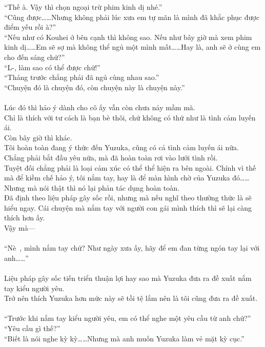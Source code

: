 \documentclass[12pt,a4paper, twosides]{book}
\begin{document}
“Thế à. Vậy thì chọn ngoại trừ phim kinh dị nhé.”\\
“Cũng được……Nhưng không phải lúc xưa em tự mãn là mình đã khắc phục được điểm yếu rồi à?”\\
“Nếu như có Kouhei ở bên cạnh thì không sao. Nếu như bây giờ mà xem phim kinh dị……Em sẽ sợ mà không thể ngủ một mình mất……Hay là, anh sẽ ở cùng em cho đến sáng chứ?”\\
“L-, làm sao có thể được chứ!”\\
“Tháng trước chẳng phải đã ngủ cùng nhau sao.”\\
“Chuyện đó là chuyện đó, còn chuyện này là chuyện này.”\\
\\
Lúc đó thì hảo ý dành cho cô ấy vẫn còn chưa nảy mầm mà.\\
Chỉ là thích với tư cách là bạn bè thôi, chứ không có thứ như là tình cảm luyến ái.\\
Còn bây giờ thì khác.\\
Tôi hoàn toàn đang ý thức đến Yuzuka, cũng có cả tình cảm luyến ái nữa.\\
Chẳng phải bắt đầu yêu nữa, mà đã hoàn toàn rơi vào lưới tình rồi.\\
Tuyệt đối chẳng phải là loại cảm xúc có thể thể hiện ra bên ngoài. Chính vì thế mà để kiềm chế hảo ý, tôi nắm tay, hay là để màn hình chờ của Yuzuka đó……\\
Nhưng mà nói thật thì nó lại phản tác dụng hoàn toàn.\\
Đã định theo liệu pháp gây sốc rồi, nhưng mà nếu nghĩ theo thường thức là sẽ hiểu ngay. Cái chuyện mà nắm tay với người con gái mình thích thì sẽ lại càng thích hơn ấy.\\
Vậy mà—\\
\\
“Nè~, mình nắm tay chứ? Như ngày xưa ấy, hãy để em đan từng ngón tay lại với anh……”\\
\\
Liệu pháp gây sốc tiến triển thuận lợi hay sao mà Yuzuka đưa ra đề xuất nắm tay kiểu người yêu.\\
Trở nên thích Yuzuka hơn mức này sẽ tồi tệ lắm nên là tôi cũng đưa ra đề xuất.\\
\\
“Trước khi nắm tay kiểu người yêu, em có thể nghe một yêu cầu từ anh chứ?”\\
“Yêu cầu gì thế?”\\
“Biết là nói nghe kỳ kỳ……Nhưng mà anh muốn Yuzuka làm vẻ mặt kỳ cục.”\\
\end{document}
